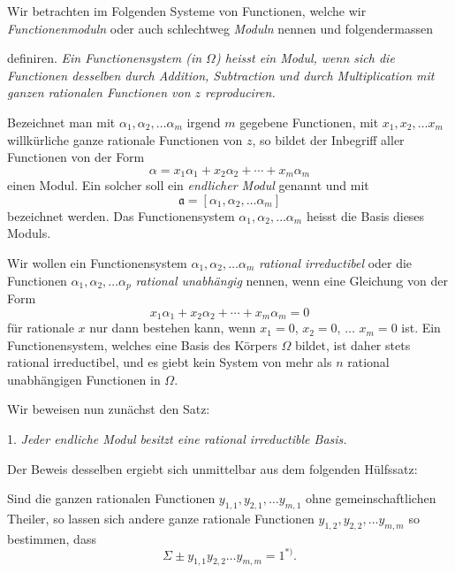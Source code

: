 \documentclass{article}
\begin{document}
Wir betrachten im Folgenden Systeme von Functionen, welche wir \emph{Functionenmoduln} oder auch schlechtweg \emph{Moduln} nennen und folgendermassen

definiren. \emph{Ein Functionensystem (in $\Omega$) heisst ein Modul, wenn sich die Functionen desselben durch Addition, Subtraction und durch Multiplication mit ganzen rationalen Functionen von $z$ reproduciren.}

Bezeichnet man mit $\alpha_{1}, \alpha_{2}, \ldots \alpha_{m}$ irgend $m$ gegebene Functionen, mit $x_{1}, x_{2}, \ldots x_{m}$ willkürliche ganze rationale Functionen von $z$, so bildet der Inbegriff aller Functionen von der Form
\[ \alpha = x_{1}\alpha_{1} + x_{2}\alpha_{2} + \cdots + x_{m}\alpha_{m} \]
einen Modul. Ein solcher soll ein \emph{endlicher Modul} genannt und mit
\[ \mathfrak{a} = [\alpha_{1}, \alpha_{2}, \ldots \alpha_{m}] \]
bezeichnet werden. Das Functionensystem $\alpha_{1}, \alpha_{2}, \ldots \alpha_{m}$ heisst die Basis dieses Moduls.

Wir wollen ein Functionensystem $\alpha_{1}, \alpha_{2}, \ldots \alpha_{m}$ \emph{rational irreductibel} oder die Functionen $\alpha_{1}, \alpha_{2}, \ldots \alpha_{p}$ \emph{rational unabhängig} nennen, wenn eine Gleichung von der Form
\[ x_{1}\alpha_{1} + x_{2}\alpha_{2} + \cdots + x_{m}\alpha_{m} = 0 \]
für rationale $x$ nur dann bestehen kann, wenn $x_{1} = 0$, $x_{2} = 0$, $\ldots$ $x_{m} = 0$ ist. Ein Functionensystem, welches eine Basis des Körpers $\Omega$ bildet, ist daher stets rational irreductibel, und es giebt kein System von mehr als $n$ rational unabhängigen Functionen in $\Omega$.

Wir beweisen nun zunächst den Satz:

1. \emph{Jeder endliche Modul besitzt eine rational irreductible Basis.}

Der Beweis desselben ergiebt sich unmittelbar aus dem folgenden Hülfssatz:

Sind die ganzen rationalen Functionen $y_{1,1}, y_{2,1}, \ldots y_{m,1}$ ohne gemeinschaftlichen Theiler, so lassen sich andere ganze rationale Functionen $y_{1,2}, y_{2,2}, \ldots y_{m,m}$ so bestimmen, dass
\[ \Sigma \pm y_{1,1}y_{2,2}\ldots y_{m,m} = 1{}^{*)}. \]
\end{document}
